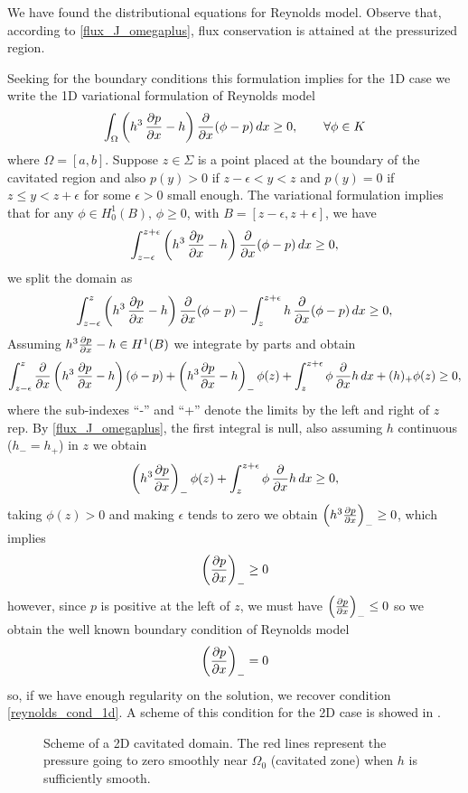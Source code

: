 We have found the distributional equations for Reynolds model. Observe that, according to \eqref{flux_J_omegaplus}, flux conservation is attained at the pressurized region.

Seeking for the boundary conditions this formulation implies for the 1D case we write the 1D variational formulation of Reynolds model
\begin{align*}
\int_\Omega \left(h^3\,\frac{\partial  p}{\partial x}-h\right) \frac{\partial }{\partial x}(\phi-p)\,dx\geq 0,\qquad\forall \phi \in K
\end{align*}
where $\Omega=[a,b]$. Suppose $z\in \Sigma$ is a point placed at the boundary of the cavitated region and also $p(y)>0$ if $z-\epsilon < y < z$ and $p(y)=0$ if $z\leq y < z+\epsilon$ for some $\epsilon>0$ small enough. The variational formulation implies that for any $\phi \in H^1_0(B),\,\phi\geq 0$, with $B=[z-\epsilon,z+\epsilon]$, we have
\begin{align*}
\int_{z-\epsilon}^{z+\epsilon}\left(h^3\,\frac{\partial  p}{\partial x}-h\right) \frac{\partial }{\partial x}(\phi-p)\,dx\geq 0,
\end{align*}
we split the domain as
\begin{align*}
\int_{z-\epsilon}^{z}\left(h^3\,\frac{\partial  p}{\partial x}-h\right) \frac{\partial }{\partial x}(\phi-p)-\int_{z	}^{z+\epsilon}h\, \frac{\partial }{\partial x}(\phi-p)\,dx\geq 0,
\end{align*}
Assuming $h^3\frac{\partial p}{\partial x}-h\in H^1(B)$ we integrate by parts and obtain
\begin{align*}
\int_{z-\epsilon}^{z}\frac{\partial }{\partial x}\left(h^3\,\frac{\partial  p}{\partial x}-h\right) (\phi-p)+\left(h^3\frac{\partial p}{\partial x}-h\right)_-\phi(z)+\int_{z	}^{z+\epsilon}\phi\,\frac{\partial }{\partial x}h\,dx+(h)_+\phi(z)\geq 0,
\end{align*}
where the sub-indexes ``-'' and ``+'' denote the limits by the left and right of $z$ rep. By \eqref{flux_J_omegaplus}, the first integral is null, also assuming $h$ continuous ($h_-=h_+$) in $z$ we obtain
\begin{align*}
\left(h^3\frac{\partial p}{\partial x}\right)_-\phi(z)+\int_{z	}^{z+\epsilon}\phi\,\frac{\partial }{\partial x}h \,dx\geq 0,
\end{align*}
taking $\phi(z)>0$ and making $\epsilon$ tends to zero we obtain $\left(h^3\frac{\partial p}{\partial x}\right)_-\geq 0$, which implies
$$\left(\frac{\partial p}{\partial x}\right)_-\geq 0$$
however, since $p$ is positive at the left of $z$, we must have $\left(\frac{\partial p}{\partial x}\right)_-\leq 0$ so we obtain the well known boundary condition of Reynolds model
$$\left(\frac{\partial p}{\partial x}\right)_-= 0$$
so, if we have enough regularity on the solution, we recover condition \eqref{reynolds_cond_1d}. A scheme of this condition for the 2D case is showed in .
\begin{figure}[h!]
\centering 
\def\svgwidth{\textwidth}	
\footnotesize{
\caption[2D cavitated domain scheme.]{Scheme of a 2D cavitated domain. The red lines represent the pressure going to zero smoothly near $\Omega_0$ (cavitated zone) when $h$ is sufficiently smooth.}\label{fig:2d_omega}}
\end{figure}
